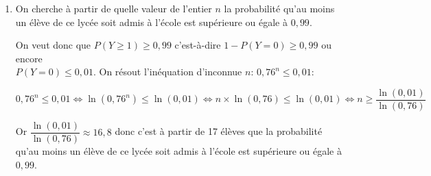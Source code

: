 \begin{enumerate}
\begin{enumerate}
		\item On cherche à partir de quelle valeur de l'entier $n$ la probabilité qu'au moins un élève de ce lycée soit admis à l'école est supérieure ou égale à $0,99$.
		
On veut donc que $P(Y\geqslant 1) \geqslant 0,99$ c'est-à-dire $1-P(Y=0) \geqslant 0,99$ ou encore\\ $P(Y=0) \leqslant 0,01$. On résout l'inéquation d'inconnue $n$: $0,76^n \leqslant 0,01$:		
		
$0,76^n \leqslant 0,01 \iff \ln\left (0,76^n\right ) \leqslant \ln\left (0,01\right )
\iff n \times \ln\left (0,76\right ) \leqslant \ln\left (0,01\right )
\iff n \geqslant \dfrac{\ln\left (0,01\right )}{\ln\left (0,76\right )}$

Or $\dfrac{\ln\left (0,01\right )}{\ln\left (0,76\right )}\approx 16,8$ donc c'est à partir de 17 élèves que la probabilité qu'au moins un élève de ce lycée soit admis à l'école est supérieure ou égale à $0,99$.
\end{enumerate}
\end{enumerate}

\bigskip

